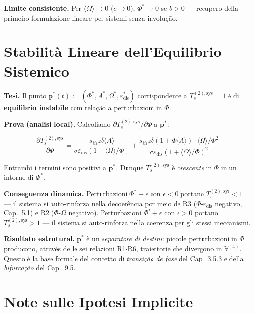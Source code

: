 \Proved{} \textbf{Limite consistente.} Per
\(\langle\Omega\rangle \to 0\) (\(c \to 0\)), \(\Phi^* \to 0\) se
\(b > 0\) --- recupero della primeiro formulazione lineare per sistemi
senza involução.



\section{Stabilità Lineare dell'Equilibrio
Sistemico}\label{stabilituxe0-lineare-dellequilibrio-sistemico}

\Hypoth{} \textbf{Tesi.} Il punto
\(\boldsymbol{p}^*(t) := (\Phi^*, A^*, \Omega^*, \varepsilon_{\text{dis}}^*)\)
corrispondente a \(T_s^{(2),\text{sys}} = 1\) è di \textbf{equilibrio
instabile} com relação a perturbazioni in \(\Phi\).

\Proved{} \textbf{Prova (analisi local).} Calcoliamo
\(\partial T_s^{(2),\text{sys}} / \partial \Phi\) a
\(\boldsymbol{p}^*\):

\[
\frac{\partial T_s^{(2),\text{sys}}}{\partial \Phi} = \frac{s_{iii}z\delta\langle A\rangle}{\sigma\varepsilon_{\text{dis}}(1+\langle\Omega\rangle/\Phi)} + \frac{s_{iii}z\delta(1+\Phi\langle A\rangle) \cdot \langle\Omega\rangle/\Phi^2}{\sigma\varepsilon_{\text{dis}}(1+\langle\Omega\rangle/\Phi)^2}
\]

Entrambi i termini sono positivi a \(\boldsymbol{p}^*\). Dunque
\(T_s^{(2),\text{sys}}\) è \emph{crescente} in \(\Phi\) in un intorno di
\(\Phi^*\).

\Hypoth{} \textbf{Conseguenza dinamica.} Perturbazioni
\(\Phi^* + \epsilon\) con \(\epsilon < 0\) portano
\(T_s^{(2),\text{sys}} < 1\) --- il sistema si auto-rinforza nella
decoerência por meio de R3 (\(\Phi\)-\(\varepsilon_{\text{dis}}\) negativo,
Cap.~5.1) e R2 (\(\Phi\)-\(\Omega\) negativo). Perturbazioni
\(\Phi^* + \epsilon\) con \(\epsilon > 0\) portano
\(T_s^{(2),\text{sys}} > 1\) --- il sistema si auto-rinforza nella
coerenza per gli stessi meccanismi.

\Proved{} \textbf{Risultato estrutural.} \(\boldsymbol{p}^*\) è un
\emph{separatore di destini}: piccole perturbazioni in \(\Phi\)
producono, através de le sei relazioni R1-R6, traiettorie che divergono
in \(\mathbb{V}^{(4)}\). Questo è la base formale del concetto di
\emph{transição de fase} del Cap.~3.5.3 e della \emph{bifurcação}
del Cap.~9.5.



\section{Note sulle Ipotesi
Implicite}\label{note-sulle-hipótese-implicite}

